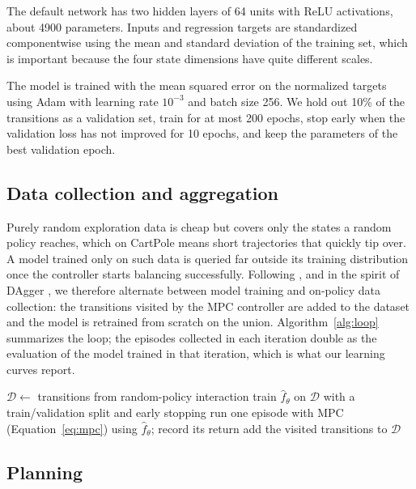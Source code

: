 \documentclass{article}
\begin{document}
The default network has two hidden layers of 64 units with ReLU activations, about 4900 parameters. Inputs and regression targets are standardized componentwise using the mean and standard deviation of the training set, which is important because the four state dimensions have quite different scales.

The model is trained with the mean squared error on the normalized targets using Adam \citep{kingma2015} with learning rate $10^{-3}$ and batch size 256. We hold out 10\% of the transitions as a validation set, train for at most 200 epochs, stop early when the validation loss has not improved for 10 epochs, and keep the parameters of the best validation epoch.

\subsection{Data collection and aggregation}

Purely random exploration data is cheap but covers only the states a random policy reaches, which on CartPole means short trajectories that quickly tip over. A model trained only on such data is queried far outside its training distribution once the controller starts balancing successfully. Following \citet{nagabandi2018}, and in the spirit of DAgger \citep{ross2011}, we therefore alternate between model training and on-policy data collection: the transitions visited by the MPC controller are added to the dataset and the model is retrained from scratch on the union. Algorithm~\ref{alg:loop} summarizes the loop; the episodes collected in each iteration double as the evaluation of the model trained in that iteration, which is what our learning curves report.

\begin{algorithm}[t]
\caption{Model-based training loop with on-policy aggregation}
\label{alg:loop}
\begin{algorithmic}[1]
\State $\mathcal{D} \gets$ transitions from random-policy interaction
  \State train $\hat{f}_\theta$ on $\mathcal{D}$ with a train/validation split and early stopping
    \State run one episode with MPC (Equation~\ref{eq:mpc}) using $\hat{f}_\theta$; record its return
    \State add the visited transitions to $\mathcal{D}$
  \EndFor
\EndFor
\end{algorithmic}
\end{algorithm}

\subsection{Planning}
\end{document}

